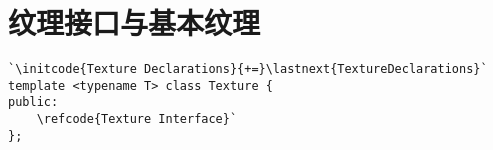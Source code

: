\section{纹理接口与基本纹理}\label{sec:纹理接口与基本纹理}

\label{code:overview_Texture}
\begin{lstlisting}
`\initcode{Texture Declarations}{+=}\lastnext{TextureDeclarations}`
template <typename T> class Texture {
public:
    \refcode{Texture Interface}`
};
\end{lstlisting}